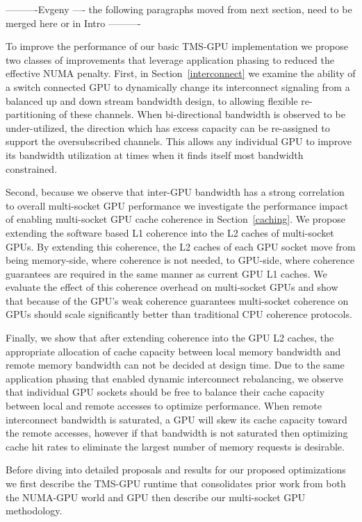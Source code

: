 ----------Evgeny ---- 
the following paragraphs moved from next section, need to be merged here or in
Intro ----------

To improve the performance of our
basic TMS-GPU implementation we propose two classes of improvements that 
leverage application phasing to reduced the effective NUMA penalty.  First, in 
Section~\ref{interconnect} we examine the ability of a switch connected GPU to 
dynamically change its interconnect signaling from a balanced up and down 
stream bandwidth design, to allowing flexible re-partitioning of these channels.  
When bi-directional bandwidth is observed to be under-utilized, the direction 
which has excess capacity can be re-assigned to support the oversubscribed 
channels. This allows any individual GPU to improve its bandwidth utilization at 
times when it finds itself most bandwidth constrained.

Second, because we observe that inter-GPU bandwidth has a strong correlation to
overall multi-socket GPU performance we investigate the performance impact of
enabling multi-socket GPU cache coherence in Section~\ref{caching}.  We propose
extending the software based L1 coherence into the L2 caches of multi-socket
GPUs.  By extending this coherence, the L2 caches of each GPU socket move from
being memory-side, where coherence is not needed, to GPU-side, where coherence
guarantees are required in the same manner as current GPU L1 caches.  We
evaluate the effect of this coherence overhead on multi-socket GPUs and show
that because of the GPU's weak coherence guarantees multi-socket coherence on
GPUs should scale significantly better than traditional CPU coherence
protocols.

Finally, we show that after extending coherence into the GPU L2 caches, the
appropriate allocation of cache capacity between local memory bandwidth and
remote memory bandwidth can not be decided at design time.  Due to the same
application phasing that enabled dynamic interconnect rebalancing, we observe
that individual GPU sockets should be free to balance their cache capacity
between local and remote accesses to optimize performance.  When remote
interconnect bandwidth is saturated, a GPU will skew its cache capacity toward
the remote accesses,  however if that bandwidth is not saturated then
optimizing cache hit rates to eliminate the largest number of memory requests
is desirable.

Before diving into detailed proposals and results for our proposed
optimizations we first describe the TMS-GPU runtime that consolidates
prior work from both the NUMA-GPU world and GPU then describe our multi-socket
GPU methodology.


